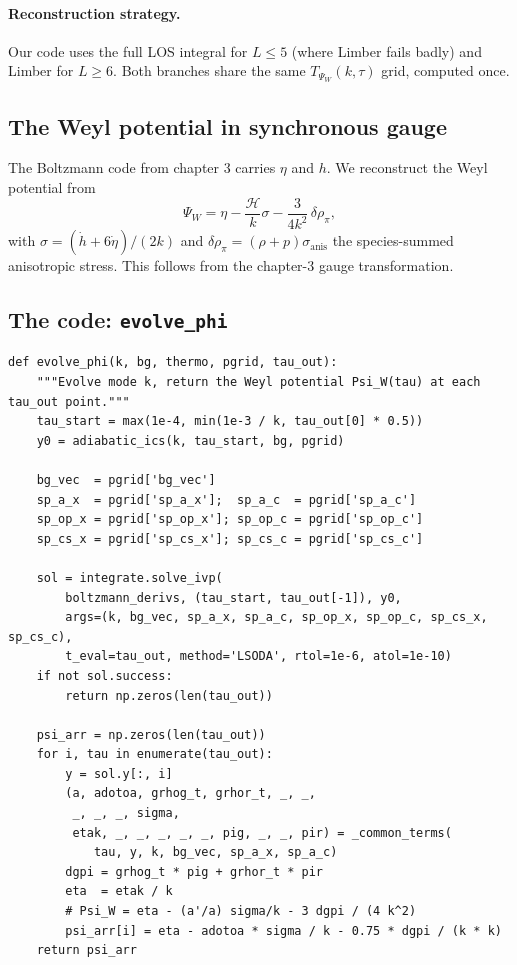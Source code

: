 \paragraph{Reconstruction strategy.}
Our code uses the full LOS integral for $L \leq 5$ (where Limber fails badly) and Limber for $L \geq 6$. Both branches share the same $T_{\Psi_W}(k, \tau)$ grid, computed once.

\subsection{The Weyl potential in synchronous gauge}

The Boltzmann code from chapter 3 carries $\eta$ and $h$. We reconstruct the Weyl potential from
\begin{equation}
  \Psi_W = \eta - \frac{\mathcal{H}}{k}\sigma - \frac{3}{4 k^2}\,\delta\rho_\pi,
  \label{eq:PsiW_synch}
\end{equation}
with $\sigma = (\dot h + 6\dot\eta)/(2k)$ and $\delta\rho_\pi = (\rho + p)\sigma_\text{anis}$ the species-summed anisotropic stress. This follows from the chapter-3 gauge transformation.

\subsection{The code: \texttt{evolve\_phi}}

\begin{codebox}
\begin{lstlisting}[style=python]
def evolve_phi(k, bg, thermo, pgrid, tau_out):
    """Evolve mode k, return the Weyl potential Psi_W(tau) at each tau_out point."""
    tau_start = max(1e-4, min(1e-3 / k, tau_out[0] * 0.5))
    y0 = adiabatic_ics(k, tau_start, bg, pgrid)

    bg_vec  = pgrid['bg_vec']
    sp_a_x  = pgrid['sp_a_x'];  sp_a_c  = pgrid['sp_a_c']
    sp_op_x = pgrid['sp_op_x']; sp_op_c = pgrid['sp_op_c']
    sp_cs_x = pgrid['sp_cs_x']; sp_cs_c = pgrid['sp_cs_c']

    sol = integrate.solve_ivp(
        boltzmann_derivs, (tau_start, tau_out[-1]), y0,
        args=(k, bg_vec, sp_a_x, sp_a_c, sp_op_x, sp_op_c, sp_cs_x, sp_cs_c),
        t_eval=tau_out, method='LSODA', rtol=1e-6, atol=1e-10)
    if not sol.success:
        return np.zeros(len(tau_out))

    psi_arr = np.zeros(len(tau_out))
    for i, tau in enumerate(tau_out):
        y = sol.y[:, i]
        (a, adotoa, grhog_t, grhor_t, _, _,
         _, _, _, sigma,
         etak, _, _, _, _, _, pig, _, _, pir) = _common_terms(
            tau, y, k, bg_vec, sp_a_x, sp_a_c)
        dgpi = grhog_t * pig + grhor_t * pir
        eta  = etak / k
        # Psi_W = eta - (a'/a) sigma/k - 3 dgpi / (4 k^2)
        psi_arr[i] = eta - adotoa * sigma / k - 0.75 * dgpi / (k * k)
    return psi_arr
\end{lstlisting}
\end{codebox}

